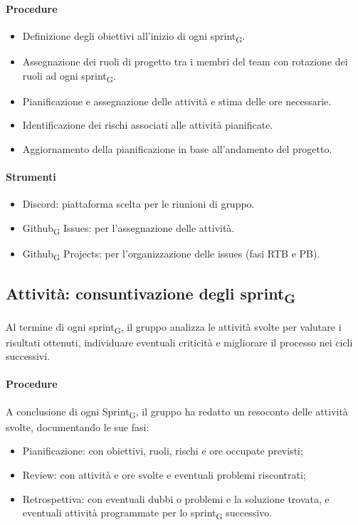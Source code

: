 \documentclass[11pt,a4paper]{article}
\newcommand{\gls}[1]{#1\textsubscript{G}}
\begin{document}
\paragraph{Procedure}
\begin{itemize}
\item Definizione degli obiettivi all’inizio di ogni \gls{sprint}.
\item Assegnazione dei ruoli di progetto tra i membri del team con rotazione dei ruoli ad ogni \gls{sprint}.
\item Pianificazione e assegnazione delle attività e stima delle ore necessarie.
\item Identificazione dei rischi associati alle attività pianificate.
\item Aggiornamento della pianificazione in base all’andamento del progetto.
\end{itemize}

\paragraph{Strumenti}
\begin{itemize}
\item Discord: piattaforma scelta per le riunioni di gruppo.
\item \gls{Github} Issues: per l'assegnazione delle attività.
\item \gls{Github} Projects: per l'organizzazione delle issues (fasi RTB e PB).
\end{itemize}

\subsection{Attività: consuntivazione degli \gls{sprint}}
Al termine di ogni \gls{sprint}, il gruppo analizza le attività svolte per valutare i risultati ottenuti, individuare eventuali criticità e migliorare il processo nei cicli successivi.

\paragraph{Procedure}
A conclusione di ogni \gls{Sprint}, il gruppo ha redatto un resoconto delle attività svolte, documentando le sue fasi:
\begin{itemize}
\item Pianificazione: con obiettivi, ruoli, rischi e ore occupate previsti;
\item Review: con attività e ore svolte e eventuali problemi riscontrati;
\item Retrospettiva: con eventuali dubbi o problemi e la soluzione trovata, e eventuali attività programmate per lo \gls{sprint} successivo. 
\end{itemize}
\end{document}
